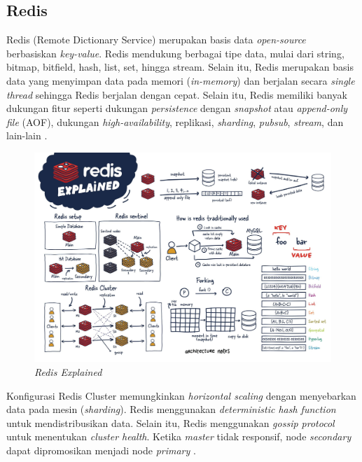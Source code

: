 \subsection{Redis}

Redis (Remote Dictionary Service) merupakan basis data \textit{open-source} berbasiskan \textit{key-value}. Redis mendukung berbagai tipe data, mulai dari string, bitmap, bitfield, hash, list, set, hingga stream. Selain itu, Redis merupakan basis data yang menyimpan data pada memori (\textit{in-memory}) dan berjalan secara \textit{single thread} sehingga Redis berjalan dengan cepat. Selain itu, Redis memiliki banyak dukungan fitur seperti dukungan \textit{persistence} dengan \textit{snapshot} atau \textit{append-only file} (AOF), dukungan \textit{high-availability}, replikasi, \textit{sharding}, \textit{pubsub}, \textit{stream}, dan lain-lain \parencite{redisExplained}.

\begin{figure}[ht]
    \centering
    \includegraphics[width=1\textwidth]{resources/chapter-2/redis.jpg}
    \caption{\textit{Redis Explained \parencite{redisExplained}}}
    \label{fig:redis-explained}
\end{figure}

Konfigurasi Redis Cluster memungkinkan \textit{horizontal scaling} dengan menyebarkan data pada mesin (\textit{sharding}). Redis menggunakan \textit{deterministic hash function} untuk mendistribusikan data. Selain itu, Redis menggunakan \textit{gossip protocol} untuk menentukan \textit{cluster health}. Ketika \textit{master} tidak responsif, node \textit{secondary} dapat dipromosikan menjadi node \textit{primary} \parencite{redisExplained}.